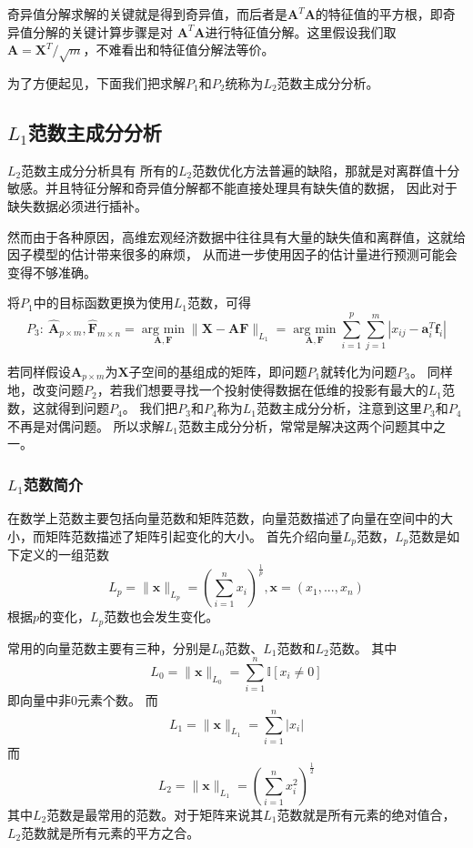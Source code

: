 奇异值分解求解的关键就是得到奇异值，而后者是$\bm{A}^T\bm{A}$的特征值的平方根，即奇异值分解的关键计算步骤是对
$\bm{A}^T\bm{A}$进行特征值分解。这里假设我们取$\bm{A} = {\bm{X}^T}/{\sqrt{m}}$，不难看出和特征值分解法等价。

为了方便起见，下面我们把求解$P_1$和$P_2$统称为$L_2$范数主成分分析。

\subsection{$L_1$范数主成分分析}

$L_2$范数主成分分析具有
所有的$L_2$范数优化方法普遍的缺陷，那就是对离群值十分敏感。并且特征分解和奇异值分解都不能直接处理具有缺失值的数据，
因此对于缺失数据必须进行插补。

然而由于各种原因，高维宏观经济数据中往往具有大量的缺失值和离群值，这就给因子模型的估计带来很多的麻烦，
从而进一步使用因子的估计量进行预测可能会变得不够准确。

将$P_1$中的目标函数更换为使用$L_1$范数，可得
\begin{equation}\label{p3}
    P_3: \ 
\hat{\bm{A}}_{p\times m}, \hat{\bm{F}}_{m\times n} = \underset{\bm{A},\bm{F}}{\operatorname{arg\ min} } \|\bm X - \bm{A}\bm{F}\|_{L_1}
= \underset{\bm{A}, \bm{F}}{\operatorname{arg\ min}} \sum_{i=1}^p \sum_{j=1}^m |x_{ij} - \bm a_i^T \bm f_i| 
\end{equation}

若同样假设$\bm{A}_{p\times m}$为$\bm{X}$子空间的基组成的矩阵，即问题$P_1$就转化为问题$P_3$。
同样地，改变问题$P_2$，若我们想要寻找一个投射使得数据在低维的投影有最大的$L_1$范数，这就得到问题$P_4$。
我们把$P_3$和$P_4$称为$L_1$范数主成分分析，注意到这里$P_3$和$P_4$不再是对偶问题。
所以求解$L_1$范数主成分分析，常常是解决这两个问题其中之一。

\subsubsection{$L_1$范数简介}
在数学上范数主要包括向量范数和矩阵范数，向量范数描述了向量在空间中的大小，而矩阵范数描述了矩阵引起变化的大小。
首先介绍向量$L_p$范数，$L_p$范数是如下定义的一组范数
\begin{equation}
    L_p = \| \bm x\|_{L_p} = (\sum_{i=1}^n x_i)^{\frac{1}{p}}, \bm x= (x_1, ..., x_n)
\end{equation}
根据$p$的变化，$L_p$范数也会发生变化。

常用的向量范数主要有三种，分别是$L_0$范数、$L_1$范数和$L_2$范数。
其中$$L_0 = \| \bm x\|_{L_0} = \sum_{i=1}^n\mathbb I[x_i \neq 0]$$即向量中非0元素个数。
而$$L_1 = \| \bm x\|_{L_1} = \sum_{i=1}^n|x_i|$$而$$L_2 = \|\bm x \|_{L_1} = (\sum_{i=1}^n x_i^2)^{\frac1{2}}$$
其中$L_2$范数是最常用的范数。对于矩阵来说其$L_1$范数就是所有元素的绝对值合，$L_2$范数就是所有元素的平方之合。

